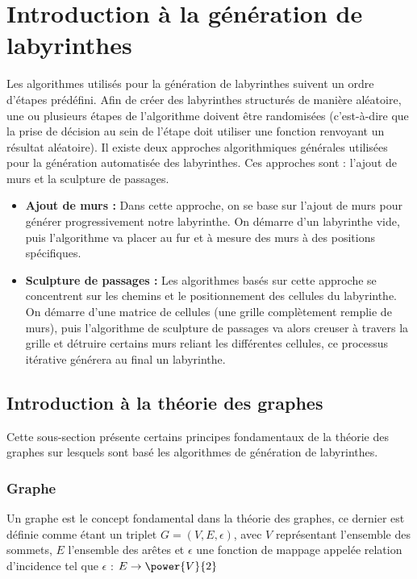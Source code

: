 \section{Introduction à la génération de labyrinthes}
Les algorithmes utilisés pour la génération de labyrinthes suivent un ordre d'étapes prédéfini. Afin de créer des labyrinthes structurés de manière aléatoire, une ou plusieurs étapes de l'algorithme doivent être randomisées (c'est-à-dire que la prise de décision au sein de l'étape doit utiliser une fonction renvoyant un résultat aléatoire). 
Il existe deux approches algorithmiques générales utilisées pour la génération automatisée des labyrinthes. Ces approches sont : l'ajout de murs et la sculpture de passages.
\\
\begin{itemize}
\item\textbf{ Ajout de murs :} Dans cette approche, on se base sur l'ajout de murs pour générer progressivement notre labyrinthe. On démarre d'un labyrinthe vide, puis l'algorithme va placer au fur et à mesure des murs à des positions spécifiques. 
\\
\item\textbf{ Sculpture de passages :} Les algorithmes basés sur cette approche se concentrent sur les chemins et le positionnement des cellules du labyrinthe. On démarre d'une matrice de cellules (une grille complètement remplie de murs), puis l'algorithme de sculpture de passages va alors creuser à travers la grille et détruire certains murs reliant les différentes cellules, ce processus itérative générera au final un labyrinthe.
\end{itemize}
\subsection{Introduction à la théorie des graphes}
Cette sous-section présente certains principes fondamentaux de la théorie des graphes sur lesquels sont basé les algorithmes de génération de labyrinthes. 
\subsubsection{Graphe}
Un graphe est le concept fondamental dans la théorie des graphes, ce dernier est définie comme étant un triplet  $G = (V, E, \epsilon )$, avec $V$ représentant l'ensemble des sommets, $E$  l'ensemble des arêtes et $\epsilon$ une fonction de mappage appelée relation d'incidence tel que $\epsilon$ : $E	\rightarrow \power{V}{2}$

